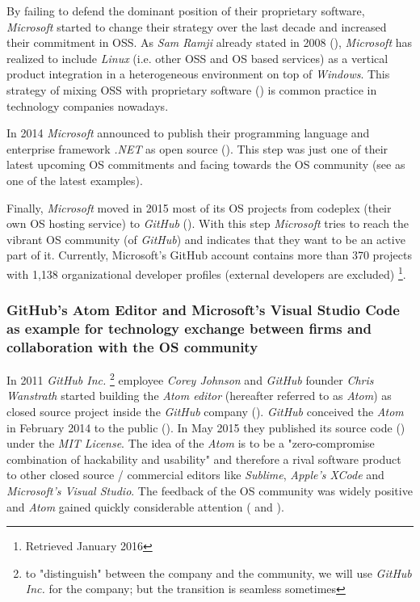 By failing to defend the dominant position of their proprietary software, \textit{Microsoft} started to change their strategy over the last decade and increased their commitment in OSS. As \textit{Sam Ramji} already stated in 2008 (\cite{microsoftosstrategy2008:online}), \textit{Microsoft} has realized to include \textit{Linux} (i.e. other OSS and OS based services) as a vertical product integration in a heterogeneous environment on top of \textit{Windows}. This strategy of mixing OSS with proprietary software (\cite{mixingosandproprietarysoftware:online}) is common practice in technology companies nowadays.

In 2014 \textit{Microsoft} announced to publish their programming language and enterprise framework \textit{.NET} as open source (\cite{msnet2015os:online}). This step was just one of their latest upcoming OS commitments and facing towards the OS community (see \cite{microsoftchakracoreonline:online} as one of the latest examples).

Finally, \textit{Microsoft} moved in 2015 most of its OS projects from codeplex (their own OS hosting service) to \textit{GitHub} (\cite{msmovingtogithub2015:online}). With this step \textit{Microsoft} tries to reach the vibrant OS community (of \textit{GitHub}) and indicates that they want to be an active part of it. Currently, Microsoft's GitHub account contains more than 370 projects with 1,138 organizational developer profiles (external developers are excluded) \footnote{Retrieved  January 2016}.

\subsubsection{GitHub's Atom Editor and Microsoft's Visual Studio Code as example for technology exchange between firms and collaboration with the OS community}

In 2011 \textit{GitHub Inc.} \footnote{to "distinguish" between the company and the community, we will use \textit{GitHub Inc.} for the company; but the transition is seamless sometimes} employee \textit{Corey Johnson} and \textit{GitHub} founder \textit{Chris Wanstrath} started building the \textit{Atom editor} (hereafter referred to as \textit{Atom}) as closed source project inside the \textit{GitHub} company (\cite{AtomV1:online}). \textit{GitHub} conceived the \textit{Atom} in February 2014 to the public (\cite{IntroducingAtom:online}). In May 2015 they published its source code (\cite{AtomIsNowOpenSource:online}) under the \textit{MIT License}. The idea of the \textit{Atom} is to be a "zero-compromise combination of hackability and usability" and therefore a rival software product to other closed source / commercial editors like \textit{Sublime}, \textit{Apple's XCode} and \textit{Microsoft's Visual Studio}. The feedback of the OS community was widely positive and \textit{Atom} gained quickly considerable attention  (\cite{AtomIsJustGettingStarted:online} and \cite{AtomReachesOneMillionActiveUsers:online}).

